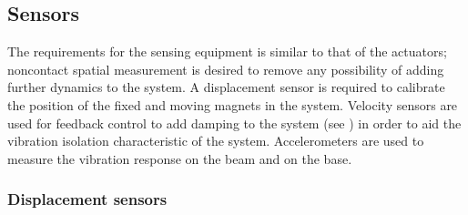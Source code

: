 \documentclass[11pt,a4paper]{memoir}
\begin{document}
\subsection{Sensors}

The requirements for the sensing equipment is similar to that of the actuators; noncontact spatial measurement is desired to remove any possibility of adding further dynamics to the system.
A displacement sensor is required to calibrate the position of the fixed and moving magnets in the system.
Velocity sensors are used for feedback control to add damping to the system (see ) in order to aid the vibration isolation characteristic of the system.
Accelerometers are used to measure the vibration response on the beam and on the base.

\subsubsection{Displacement sensors}
\end{document}
